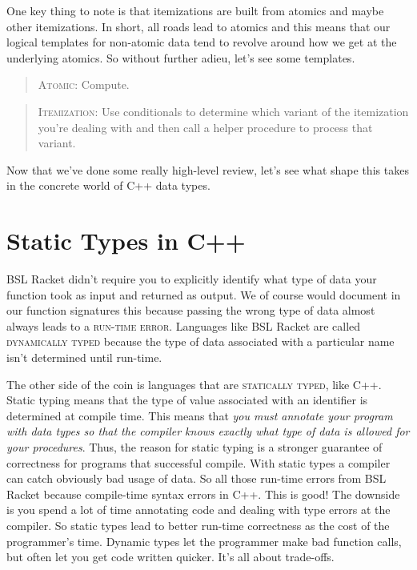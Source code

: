 \documentclass[]{tufte-handout}
\begin{document}
One key thing to note is that itemizations are built from atomics and maybe other itemizations. In short, all roads lead to atomics and this means that our logical templates for non-atomic data tend to revolve around how we get at the underlying atomics. So without further adieu, let's see some templates. 

\begin{quote}
\textsc{Atomic}: Compute.  
\end{quote}

\begin{quote}
\textsc{Itemization}: Use conditionals to determine which variant of the itemization you're dealing with and then call  a helper procedure to process that variant.
\end{quote}

Now that we've done some really high-level review, let's see what shape this takes in the concrete world of C++ data types.


\section{Static Types in C++}

BSL Racket didn't require you to explicitly identify what type of data your function took as input and returned as output.  We of course would document in our function signatures this because passing the wrong type of data almost always leads to a \textsc{run-time error}. Languages like BSL Racket are called \textsc{dynamically typed} because the type of data associated with a particular name isn't determined until run-time.  

The other side of the coin is languages that are \textsc{statically typed}, like C++.  Static typing means that the type of value associated with an identifier is determined at compile time.  This means that \textit{you must annotate  your program with data types so that the compiler knows exactly what type of data is allowed for your procedures}. Thus, the reason for static typing is a stronger guarantee of correctness for programs that successful compile.  With static types a compiler can catch obviously bad usage of data. So all those run-time errors from BSL Racket because compile-time syntax errors in C++.  This is good! The downside is you spend a lot of time annotating code and dealing with type errors at the compiler. So static types lead to better run-time correctness as the cost of the programmer's time. Dynamic types let the programmer make bad function calls, but often let you get code written quicker. It's all about trade-offs.   
\end{document}
